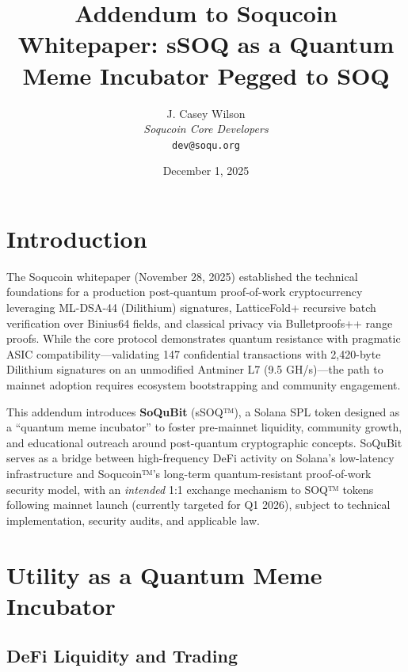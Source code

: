 \documentclass[10pt]{article}
\title{\textbf{Addendum to Soqucoin Whitepaper: sSOQ as a Quantum Meme Incubator Pegged to SOQ}}
\author{J. Casey Wilson \\ \textit{Soqucoin Core Developers} \\ \texttt{dev@soqu.org}}
\date{December 1, 2025}
\begin{document}
\maketitle

\noindent{}

\section{Introduction}

The Soqucoin whitepaper (November 28, 2025) established the technical foundations for a production post-quantum proof-of-work cryptocurrency leveraging ML-DSA-44 (Dilithium) signatures, LatticeFold+ recursive batch verification over Binius64 fields, and classical privacy via Bulletproofs++ range proofs. While the core protocol demonstrates quantum resistance with pragmatic ASIC compatibility—validating 147 confidential transactions with 2,420-byte Dilithium signatures on an unmodified Antminer L7 (9.5 GH/s)—the path to mainnet adoption requires ecosystem bootstrapping and community engagement.

This addendum introduces \textbf{SoQuBit} (sSOQ™), a Solana SPL token designed as a ``quantum meme incubator'' to foster pre-mainnet liquidity, community growth, and educational outreach around post-quantum cryptographic concepts. SoQuBit serves as a bridge between high-frequency DeFi activity on Solana's low-latency infrastructure and Soqucoin™'s long-term quantum-resistant proof-of-work security model, with an \textit{intended} 1:1 exchange mechanism to SOQ™ tokens following mainnet launch (currently targeted for Q1 2026), subject to technical implementation, security audits, and applicable law.

\section{Utility as a Quantum Meme Incubator}

\subsection{DeFi Liquidity and Trading}
\end{document}
